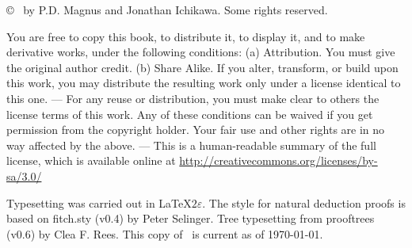 \vfill
{
\copyright\  by P.D. Magnus and Jonathan Ichikawa. Some rights reserved.
}

{\footnotesize
You are free to copy this book, to distribute it, to display it, and to make derivative works, under the following conditions: (a) Attribution. You must give the original author credit. (b) Share Alike. If you alter, transform, or build upon this work, you may distribute the resulting work only under a license identical to this one. --- For any reuse or distribution, you must make clear to others the license terms of this work. Any of these conditions can be waived if you get permission from the copyright holder. Your fair use and other rights are in no way affected by the above. --- This is a human-readable summary of the full license, which is available online at \url{http://creativecommons.org/licenses/by-sa/3.0/}

Typesetting was carried out  in \LaTeX$2\varepsilon$. The style for natural deduction proofs is based on fitch.sty (v0.4) by Peter Selinger. Tree typesetting from prooftrees (v0.6) by Clea F. Rees. This copy of \forallx\ is current as of \today.
}